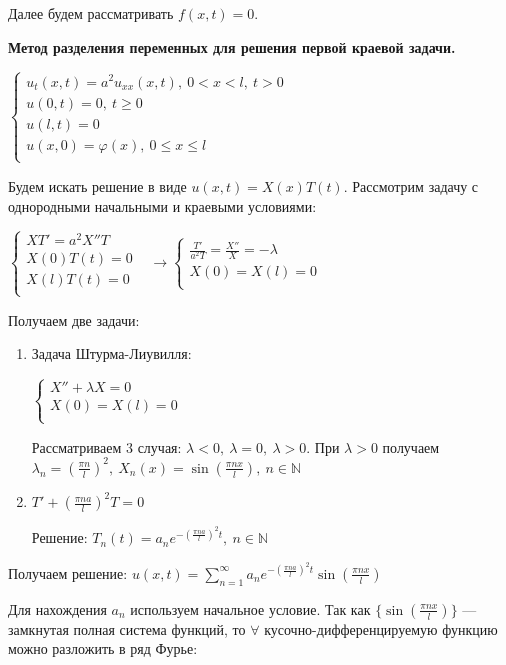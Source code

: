 \bigbreak
Далее будем рассматривать $f(x,t)=0$.

\bigbreak
\textbf{Метод разделения переменных для решения первой краевой задачи.}

$\begin{cases}
    u_t(x,t)=a^2u_{xx}(x,t),~0<x<l,~t>0&\\
    u(0,t)=0,~t\geqslant0&\\
    u(l,t)=0&\\
    u(x,0)=\varphi(x),~0\leqslant x\leqslant l&\\
\end{cases}$

\bigbreak
Будем искать решение в виде $u(x,t)=X(x)T(t)$. Рассмотрим задачу с однородными начальными и краевыми условиями:

$\begin{cases}
XT'=a^2X''T&\\
X(0)T(t)=0&\\
X(l)T(t)=0&\\
\end{cases} \rightarrow 
\begin{cases}
\frac{T'}{a^2T}=\frac{X''}{X}=-\lambda&\\
X(0)=X(l)=0&\\
\end{cases}$

\bigbreak
Получаем две задачи:
\begin{enumerate}
    \item Задача Штурма-Лиувилля:
    
    $\begin{cases}
    X''+\lambda X=0&\\
    X(0)=X(l)=0&\\
    \end{cases}$
    
    Рассматриваем 3 случая: $\lambda<0,~\lambda=0,~\lambda>0$. При $\lambda>0$ получаем $\lambda_n=(\frac{\pi n}{l})^2,~X_n(x)=\sin(\frac{\pi n x}{l}),~n\in\mathbb{N}$
    
    \item $T'+(\frac{\pi n a}{l})^2 T = 0$
    
    Решение: $T_n(t)=a_n e^{-(\frac{\pi n a}{l})^2t},~n\in\mathbb{N}$
\end{enumerate}

\bigbreak
Получаем решение: $u(x,t)=\displaystyle\sum_{n=1}^{\infty} a_n e^{-(\frac{\pi n a}{l})^2t} \sin(\frac{\pi n x}{l})$

Для нахождения $a_n$ используем начальное условие.
Так как $\{\sin(\frac{\pi n x}{l})\}$ --- замкнутая полная система функций, то $\forall$ кусочно-дифференцируемую функцию можно разложить в ряд Фурье:

